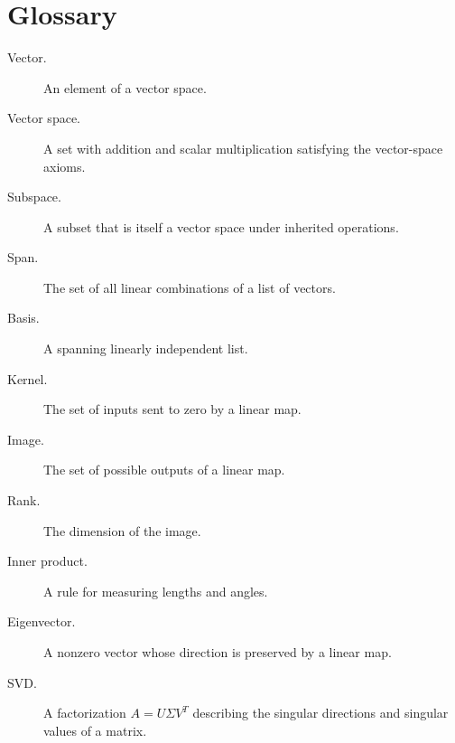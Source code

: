 \chapter{Glossary}
\label{ch:glossary}

\begin{description}
  \item[Vector.] An element of a vector space.
  \item[Vector space.] A set with addition and scalar multiplication satisfying
    the vector-space axioms.
  \item[Subspace.] A subset that is itself a vector space under inherited
    operations.
  \item[Span.] The set of all linear combinations of a list of vectors.
  \item[Basis.] A spanning linearly independent list.
  \item[Kernel.] The set of inputs sent to zero by a linear map.
  \item[Image.] The set of possible outputs of a linear map.
  \item[Rank.] The dimension of the image.
  \item[Inner product.] A rule for measuring lengths and angles.
  \item[Eigenvector.] A nonzero vector whose direction is preserved by a linear
    map.
  \item[SVD.] A factorization $A=U\Sigma V^T$ describing the singular
    directions and singular values of a matrix.
\end{description}
